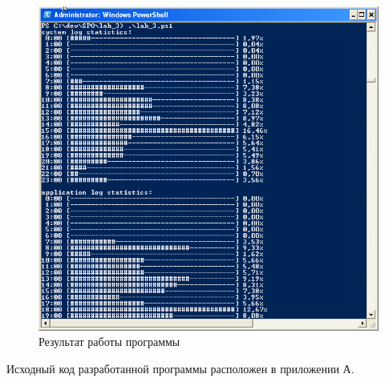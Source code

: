 \begin{figure}[h!]
  \centering
  \includegraphics[width=150mm]{img/screen}
  \caption{Результат работы программы}\label{fig:screen}
\end{figure}

Исходный код разработанной программы расположен в приложении А.

\newpage
